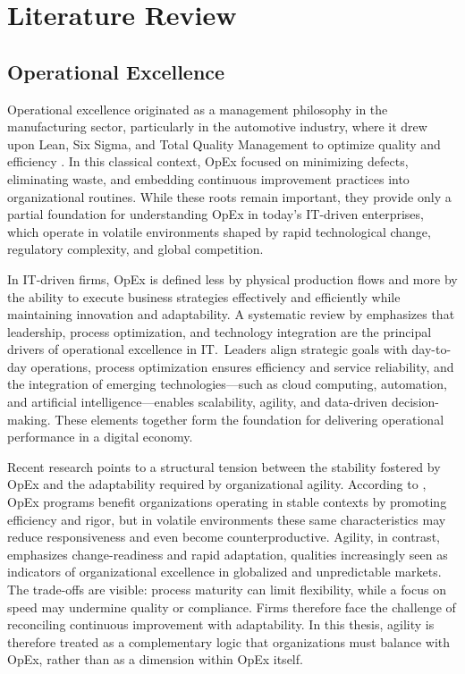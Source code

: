 \section{Literature Review}\label{sec:lit-rev}

\subsection{Operational Excellence}\label{subsec:op-ex}
Operational excellence originated as a management philosophy in the manufacturing sector, particularly in the automotive industry, where it drew upon Lean, Six Sigma, and Total Quality Management to optimize quality and efficiency \parencite{juranQuality1999, womackLean2013}. In this classical context, OpEx focused on minimizing defects, eliminating waste, and embedding continuous improvement practices into organizational routines. While these roots remain important, they provide only a partial foundation for understanding OpEx in today's IT-driven enterprises, which operate in volatile environments shaped by rapid technological change, regulatory complexity, and global competition.

In IT-driven firms, OpEx is defined less by physical production flows and more by the ability to execute business strategies effectively and efficiently while maintaining innovation and adaptability. A systematic review by \textcite{owoadeSystematic2024} emphasizes that leadership, process optimization, and technology integration are the principal drivers of operational excellence in IT.~Leaders align strategic goals with day-to-day operations, process optimization ensures efficiency and service reliability, and the integration of emerging technologies---such as cloud computing, automation, and artificial intelligence---enables scalability, agility, and data-driven decision-making. These elements together form the foundation for delivering operational performance in a digital economy.

Recent research points to a structural tension between the stability fostered by OpEx and the adaptability required by organizational agility. According to \textcite{carvalhoOperational2023}, OpEx programs benefit organizations operating in stable contexts by promoting efficiency and rigor, but in volatile environments these same characteristics may reduce responsiveness and even become counterproductive. Agility, in contrast, emphasizes change-readiness and rapid adaptation, qualities increasingly seen as indicators of organizational excellence in globalized and unpredictable markets. The trade-offs are visible: process maturity can limit flexibility, while a focus on speed may undermine quality or compliance. Firms therefore face the challenge of reconciling continuous improvement with adaptability. In this thesis, agility is therefore treated as a complementary logic that organizations must balance with OpEx, rather than as a dimension within OpEx itself.

